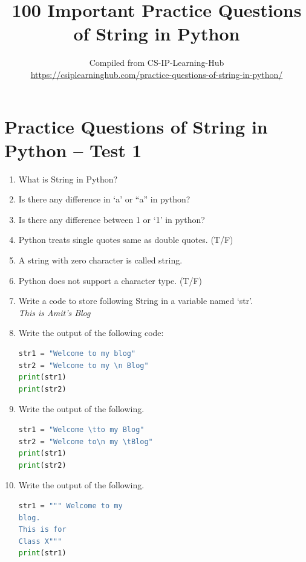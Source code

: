 \documentclass[12pt,a4paper]{article}
\title{\textbf{100 Important Practice Questions of String in Python}}
\author{Compiled from CS-IP-Learning-Hub\\
\url{https://csiplearninghub.com/practice-questions-of-string-in-python/}}
\date{}
\begin{document}
\maketitle
\tableofcontents
\newpage

\section{Practice Questions of String in Python -- Test 1}

\begin{enumerate}[label=\textbf{Q\arabic*.}]

\item What is String in Python?

\item Is there any difference in `a' or ``a'' in python?

\item Is there any difference between 1 or `1' in python?

\item Python treats single quotes same as double quotes. (T/F)

\item A string with zero character is called \underline{\hspace{3cm}} string.

\item Python does not support a character type. (T/F)

\item Write a code to store following String in a variable named `str'. \\
\textit{This is Amit's Blog}

\item Write the output of the following code:
\begin{lstlisting}[language=Python]
str1 = "Welcome to my blog"
str2 = "Welcome to my \n Blog"
print(str1)
print(str2)
\end{lstlisting}

\item Write the output of the following.
\begin{lstlisting}[language=Python]
str1 = "Welcome \tto my Blog"
str2 = "Welcome to\n my \tBlog"
print(str1)
print(str2)
\end{lstlisting}

\item Write the output of the following.
\begin{lstlisting}[language=Python]
str1 = """ Welcome to my
blog.
This is for
Class X"""
print(str1)
\end{lstlisting}

\end{enumerate}
\end{document}
